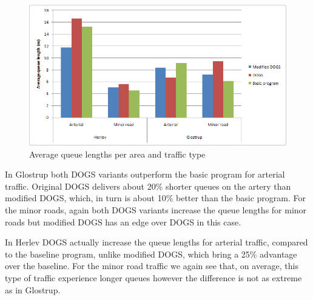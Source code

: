 \begin{figure}[htbp]
\centering
\includegraphics[width=\singleimwidth]{aveq_total_area_vs_traffic-type.png}
\caption{Average queue lengths per area and traffic type}
\label{fig:aveq_detail}
\end{figure}

In Glostrup both DOGS variants outperform the basic program for arterial traffic. Original DOGS delivers about 20\% shorter queues on the artery than modified DOGS, which, in turn is about 10\% better than the basic program. For the minor roads, again both DOGS variants increase the queue lengths for minor roads but modified DOGS has an edge over DOGS in this case.

In Herlev DOGS actually increase the queue lengths for arterial traffic, compared to the baseline program, unlike modified DOGS, which bring a 25\% advantage over the baseline. For the minor road traffic we again see that, on average, this type of traffic experience longer queues however the difference is not as extreme as in Glostrup.

